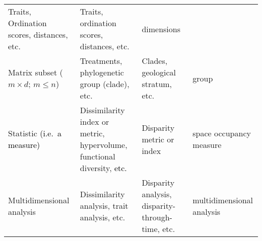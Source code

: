 \documentclass[]{article}
\begin{document}
\begin{longtable}[]{@{}llll@{}}
\begin{minipage}[t]{0.24\columnwidth}
Traits, Ordination scores, distances, etc.\strut
\end{minipage} & \begin{minipage}[t]{0.24\columnwidth}\raggedright\strut
Traits, ordination scores, distances, etc.\strut
\end{minipage} & \begin{minipage}[t]{0.15\columnwidth}\raggedright\strut
dimensions\strut
\end{minipage}\tabularnewline
\begin{minipage}[t]{0.24\columnwidth}\raggedright\strut
Matrix subset (\(m \times d\); \(m \leq n\))\strut
\end{minipage} & \begin{minipage}[t]{0.24\columnwidth}\raggedright\strut
Treatments, phylogenetic group (clade), etc.\strut
\end{minipage} & \begin{minipage}[t]{0.24\columnwidth}\raggedright\strut
Clades, geological stratum, etc.\strut
\end{minipage} & \begin{minipage}[t]{0.15\columnwidth}\raggedright\strut
group\strut
\end{minipage}\tabularnewline
\begin{minipage}[t]{0.24\columnwidth}\raggedright\strut
Statistic \textcolor{black}{ (i.e.~a measure) }\strut
\end{minipage} & \begin{minipage}[t]{0.24\columnwidth}\raggedright\strut
Dissimilarity index or metric, hypervolume, functional diversity,
\textcolor{black}{ etc. }\strut
\end{minipage} & \begin{minipage}[t]{0.24\columnwidth}\raggedright\strut
Disparity metric or index\strut
\end{minipage} & \begin{minipage}[t]{0.15\columnwidth}\raggedright\strut
space occupancy measure\strut
\end{minipage}\tabularnewline
\begin{minipage}[t]{0.24\columnwidth}\raggedright\strut
Multidimensional analysis\strut
\end{minipage} & \begin{minipage}[t]{0.24\columnwidth}\raggedright\strut
Dissimilarity analysis, trait analysis, etc.\strut
\end{minipage} & \begin{minipage}[t]{0.24\columnwidth}\raggedright\strut
Disparity analysis, disparity-through-time, etc.\strut
\end{minipage} & \begin{minipage}[t]{0.15\columnwidth}\raggedright\strut
multidimensional analysis\strut
\end{minipage}\tabularnewline
\bottomrule
\end{longtable}
\end{document}
